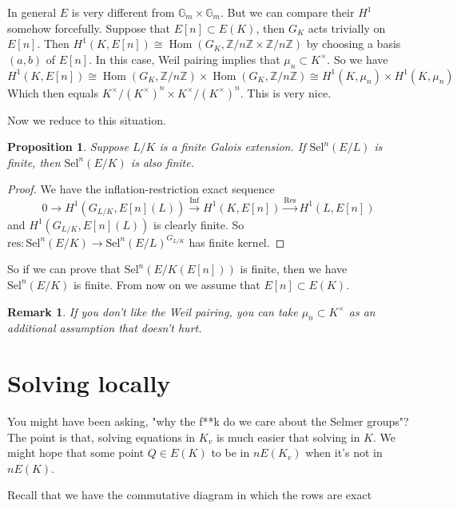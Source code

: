 \documentclass{article}
\newtheorem{rmk}[thm]{Remark}
\newtheorem{prop}[thm]{Proposition}
\newcommand{\mn}{\mu_{n}}
\newcommand{\kmkn}{K ^{\times} / (K ^{\times})^{n}}
\DeclareMathOperator{\hhom}{Hom}
\begin{document}
In general $ E $ is very different from $ \mathbb{G}_{m}\times \mathbb{G}_{m} $.
But we can compare their $ H ^{1} $ somehow forcefully.
Suppose that $ E [n] \subset E (K) $, then $ G _{K} $ acts trivially on $ E [n] $.
Then $ H ^{1}(K, E [n]) \cong \hhom (G _{K}, \mathbb{Z}/n \mathbb{Z} \times \mathbb{Z}/n \mathbb{Z})$
by choosing a basis $ (a, b) $ of $ E [n] $.
In this case, Weil pairing implies that $ \mn \subset K ^{\times} $.
So we have
$$ H ^{1}(K, E [n]) \cong \hhom (G _{K}, \mathbb{Z}/n \mathbb{Z})\times
\hhom (G _{K}, \mathbb{Z}/n \mathbb{Z})\cong H ^{1}(K, \mn)\times H ^{1}(K, \mn)
$$
Which then equals $ \kmkn\times \kmkn $.
This is very nice.

Now we reduce to this situation.
\begin{prop}
Suppose $ L/K $ is a finite Galois extension.
If $ \mathrm{Sel}^{n}(E/L) $ is finite, then
$ \mathrm{Sel}^{n}(E/K) $ is also finite.
\end{prop}

\begin{proof}
We have the inflation-restriction exact sequence
$$ 0\to H ^{1}(G _{L/K}, E [n](L))\xrightarrow{\mathrm{Inf}}
H ^{1}(K, E [n]) \xrightarrow{\mathrm{Res}}
H ^{1}(L, E [n])$$
and $ H ^{1}(G _{L/K}, E [n](L)) $ is clearly finite.
So $ \mathrm{res}: \mathrm{Sel}^{n}(E/K)\to \mathrm{Sel}^{n}(E/L)^{G _{L/K}} $
has finite kernel.
\end{proof}

So if we can prove that $ \mathrm{Sel}^{n}(E/K (E [n])) $ is finite,
then we have $ \mathrm{Sel}^{n}(E/K) $ is finite.
From now on we assume that $ E [n]\subset E (K) $.
\begin{rmk}
If you don't like the Weil pairing, you can take $ \mn \subset K ^{\times} $ as an
additional assumption that doesn't hurt.
\end{rmk}

\section{Solving locally}

You might have been asking,
"why the f**k do we care about the Selmer groups"?
The point is that, solving equations in $ K _{v} $ is much easier that
solving in $ K $.
We might hope that some point $ Q \in E (K)$ to be in $ nE (K _{v}) $ when it's not in $ n E (K) $.

Recall that we have the commutative diagram in which the rows are exact
\begin{figure}[H]
\centering
{}

\end{figure}
\end{document}
